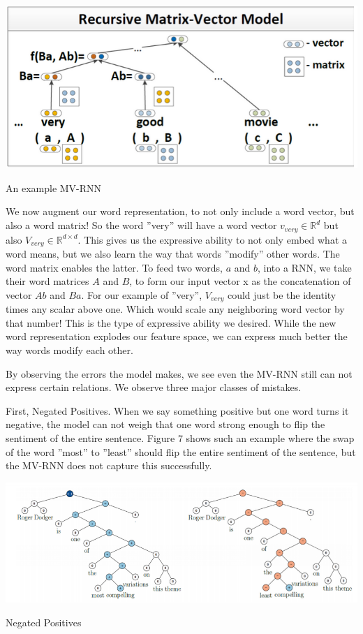 \documentclass{tufte-handout}
\begin{document}
\begin{marginfigure}%
  \includegraphics[width=\linewidth]{img6}
  \caption{An example MV-RNN}
  \label{fig:img6}
\end{marginfigure}

We now augment our word representation, to not only include a word vector, but also a word matrix! So the word ''very'' will have a word vector  $v_{very} \in \mathbb{R}^{d}$ but also $V_{very} \in \mathbb{R}^{d\times d}$. This gives us the expressive ability to not only embed what a word means, but we also learn the way that words ''modify'' other words. The word matrix enables the latter. To feed two words, $a$ and $b$, into a RNN, we take their word matrices $A$ and $B$, to form our input vector x as the concatenation of vector $Ab$ and $Ba$. For our example of ''very'', $V_{very}$ could just be the identity times any scalar above one. Which would scale any neighboring word vector by that number! This is the type of expressive ability we desired. While the new word representation explodes our feature space, we can express much better the way words modify each other.

By observing the errors the model makes, we see even the MV-RNN still can not express certain relations. We observe three major classes of mistakes.

First, Negated Positives. When we say something positive but one word turns it negative, the model can not weigh that one word strong enough to flip the sentiment of the entire sentence. Figure 7 shows such an example where the swap of the word ''most'' to ''least'' should flip the entire sentiment of the sentence, but the MV-RNN does not capture this successfully.



\begin{marginfigure}%
  \includegraphics[width=\linewidth]{img7}
  \caption{Negated Positives}
  \label{fig:img7}
\end{marginfigure}
\end{document}
